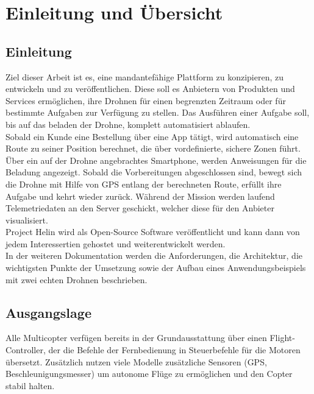\chapter{Einleitung und Übersicht}

\section{Einleitung}

Ziel dieser Arbeit ist es, eine mandantefähige Plattform zu konzipieren, zu entwickeln und zu veröffentlichen. Diese soll es Anbietern von Produkten und Services ermöglichen, ihre Drohnen für einen begrenzten Zeitraum oder für bestimmte Aufgaben zur Verfügung zu stellen. Das Ausführen einer Aufgabe soll, bis auf das beladen der Drohne, komplett automatisiert ablaufen. \\

Sobald ein Kunde eine Bestellung über eine App tätigt, wird automatisch eine Route zu seiner Position berechnet, die über vordefinierte, sichere Zonen führt. Über ein auf der Drohne angebrachtes Smartphone, werden Anweisungen für die Beladung angezeigt. Sobald die Vorbereitungen abgeschlossen sind, bewegt sich die Drohne mit Hilfe von GPS entlang der berechneten Route, erfüllt ihre Aufgabe und kehrt wieder zurück. Während der Mission werden laufend Telemetriedaten an den Server geschickt, welcher diese für den Anbieter visualisiert.\\

Project Helin wird als Open-Source Software veröffentlicht und kann dann von jedem Interessertien gehostet und weiterentwickelt werden.\\

In der weiteren Dokumentation werden die Anforderungen, die Architektur, die wichtigsten Punkte der Umsetzung sowie der Aufbau eines Anwendungsbeispiels mit zwei echten Drohnen beschrieben.

\section{Ausgangslage}

Alle Multicopter verfügen bereits in der Grundausstattung über einen \Gls{Flight-Controller}, der die Befehle der Fernbedienung in Steuerbefehle für die Motoren übersetzt. Zusätzlich nutzen viele Modelle zusätzliche Sensoren (GPS, Beschleunigungsmesser) um autonome Flüge zu ermöglichen und den Copter stabil halten. \\

